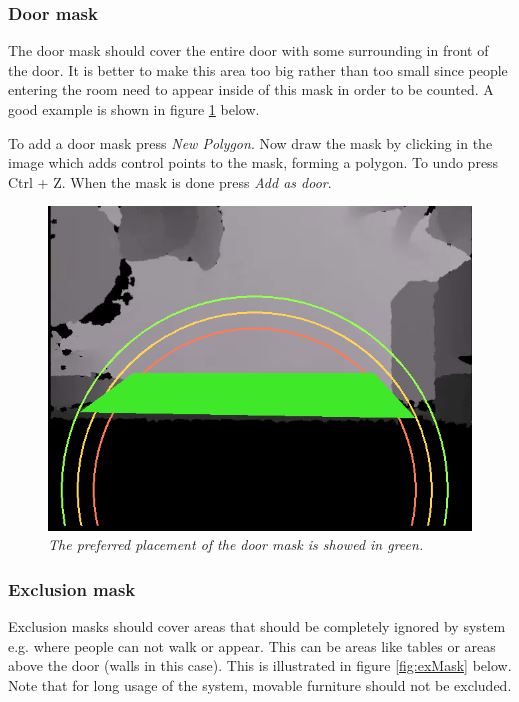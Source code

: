 \newpage
\subsubsection{Door mask}
The door mask should cover the entire door with some surrounding in front of the door. It is better to make this area too big rather than too small since people entering the room need to appear inside of this mask in order to be counted. A good example is shown in figure \ref{fig:doorMask} below. 

To add a door mask press \textit{New Polygon}. Now draw the mask by clicking in the image which adds control points to the mask, forming a polygon. To undo press Ctrl + Z. When the mask is done press \textit{Add as door}.

\begin{figure}[H]
	\centering
	\includegraphics[width=\linewidth]{images/Manual3.png}
	\caption[Exclusion mask]{\textit{The preferred placement of the door mask is showed in green.}}
	\label{fig:doorMask}  %
\end{figure}

\newpage
\subsubsection{Exclusion mask}
Exclusion masks should cover areas that should be completely ignored by system e.g. where people can not walk or appear. This can be areas like tables or areas above the door (walls in this case). This is illustrated in figure \ref{fig:exMask} below. Note that for long usage of the system, movable furniture should not be excluded.

